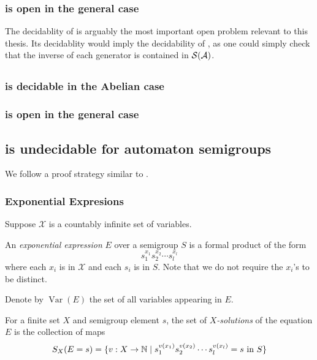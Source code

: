 \documentclass[11pt, titlepage]{article}
\begin{document}
\subsubsection{ is open in the general case}

The decidablity of  is arguably the most important
open problem relevant to this thesis. Its decidablity would imply the
decidability of , as one could simply check that the
inverse of each generator is contained in $\mathcal{S}(\mathcal{A})$.

\subsection{}
\subsubsection{ is decidable in the Abelian case}
\subsubsection{ is open in the general case}

\subsection{ is undecidable for automaton semigroups}
We follow a proof strategy similar to \cite{Konig15:knapsack}.


\subsubsection{Exponential Expresions}

Suppose $\mathcal{X}$ is a countably infinite set of variables.
\begin{definition}
  An \emph{exponential expression} $E$ over a semigroup $S$ is a
  formal product of the form
  \[
    s_1^{x_1} s_2^{x_2}\cdots s_l^{x_l}
  \]
  where each $x_i$ is in $\mathcal{X}$ and each $s_i$ is in $S$. Note
  that we do not require the $x_i$'s to be distinct.
\end{definition}

Denote by $\operatorname{Var}(E)$ the set of all variables appearing
in $E$.
\begin{definition}
  For a finite set $X$ and semigroup element $s$, the set of
  \emph{$X$-solutions} of the equation $E$ is the collection of maps
  \[
    S_X(E = s) = \{ v : X \rightarrow \mathbb{N} \mid
    s_1^{v(x_1)} s_2^{v(x_2)}\cdots s_l^{v(x_l)} = s
    \text{ \normalfont in } S
    \}
  \]
\end{definition}
\end{document}
